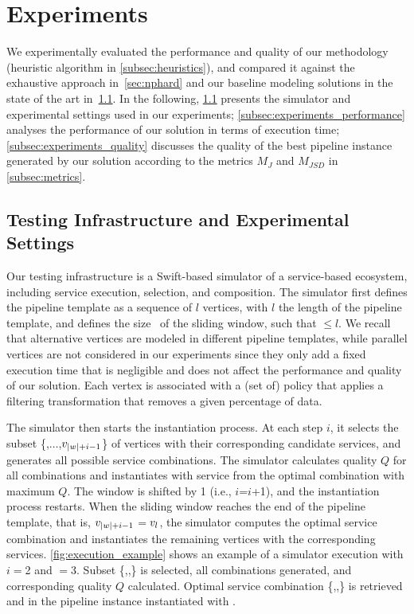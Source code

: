 \section{Experiments}\label{sec:experiment}
We experimentally evaluated the performance and quality of our methodology (heuristic algorithm in \cref{subsec:heuristics}), and compared it against the exhaustive approach in~\cref{sec:nphard} {\color{OurColor}and our baseline modeling solutions in the state of the art in~\cref{subsec:experiments_infrastructure}.} In the following,
\cref{subsec:experiments_infrastructure} presents the simulator and experimental settings used in our experiments;
\cref{subsec:experiments_performance} analyses the performance of our solution in terms of execution time; \cref{subsec:experiments_quality} discusses the quality of the best pipeline instance generated by our solution according to the metrics $M_J$ and $M_{JSD}$ in \cref{subsec:metrics}.

\subsection{Testing Infrastructure and Experimental Settings}\label{subsec:experiments_infrastructure}
Our testing infrastructure is a Swift-based simulator of a service-based ecosystem, including service execution, selection, and composition.
The simulator first defines the pipeline template as a sequence of $l$ vertices, with $l$ the length of the pipeline template, and defines the size \windowsize\ of the sliding window, such that \windowsize$\leq$$l$. We recall that alternative vertices are modeled in different pipeline templates, while parallel vertices are not considered in our experiments since they only add a fixed execution time that is negligible and does not affect the performance and quality of our solution. Each vertex is associated with a (set of) policy that applies a filtering transformation that removes a given percentage of data.


      The simulator then starts the instantiation process. At each step $i$, it selects the subset \{,$\ldots$,$v_{|w|+i-1}$\} of vertices with their corresponding candidate services, and generates all possible service combinations. The simulator calculates quality $Q$ for all combinations and instantiates  with service  from the optimal combination with maximum $Q$. The window is shifted by 1 (i.e., $i$=$i$+1), and the instantiation process restarts. When the sliding window reaches the end of the pipeline template, that is, $v_{|w|+i-1}$$=$$v_{l}$, the simulator computes the optimal service combination and instantiates the remaining vertices with the corresponding services. \cref{fig:execution_example} shows an example of a simulator execution with $i$$=$2 and \windowsize$=$3. Subset \{,,\} is selected, all combinations generated, and corresponding quality $Q$ calculated. Optimal service combination \{,,\} is retrieved and  in the pipeline instance instantiated with .

